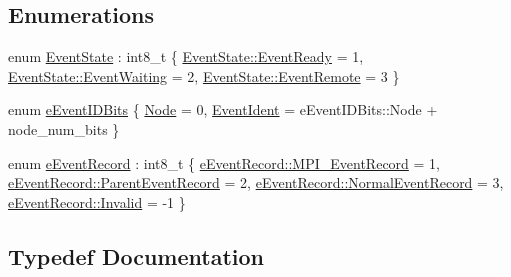 \subsection*{Enumerations}
\begin{DoxyCompactItemize}
\item 
enum \hyperlink{namespacevt_1_1event_a787aca6361696d96d817a639195c429c}{Event\+State} \+: int8\+\_\+t \{ \hyperlink{namespacevt_1_1event_a787aca6361696d96d817a639195c429cac39388d25cc07031a0e9939837999e92}{Event\+State\+::\+Event\+Ready} = 1, 
\hyperlink{namespacevt_1_1event_a787aca6361696d96d817a639195c429ca9fa9370ca123bee33d77fccd7ee8c459}{Event\+State\+::\+Event\+Waiting} = 2, 
\hyperlink{namespacevt_1_1event_a787aca6361696d96d817a639195c429ca6c1cd1c5d55dc05e2b16a4f5f2d2dadd}{Event\+State\+::\+Event\+Remote} = 3
 \}
\item 
enum \hyperlink{namespacevt_1_1event_ad563011dc9e3e01042df27d00092aceb}{e\+Event\+I\+D\+Bits} \{ \hyperlink{namespacevt_1_1event_ad563011dc9e3e01042df27d00092acebadcc2ad1a42eece610bebe64d6c0128d8}{Node} = 0, 
\hyperlink{namespacevt_1_1event_ad563011dc9e3e01042df27d00092aceba2afe9027cb72d9816ad052b1614fbc7f}{Event\+Ident} = e\+Event\+I\+D\+Bits\+:\+:Node + node\+\_\+num\+\_\+bits
 \}
\item 
enum \hyperlink{namespacevt_1_1event_a1ea9fec44d101bf40b8fd786d44ebed9}{e\+Event\+Record} \+: int8\+\_\+t \{ \hyperlink{namespacevt_1_1event_a1ea9fec44d101bf40b8fd786d44ebed9a4d5894349a7d2598349be83e506c5450}{e\+Event\+Record\+::\+M\+P\+I\+\_\+\+Event\+Record} = 1, 
\hyperlink{namespacevt_1_1event_a1ea9fec44d101bf40b8fd786d44ebed9ae0c752eac6805bd001b4aa4912771c14}{e\+Event\+Record\+::\+Parent\+Event\+Record} = 2, 
\hyperlink{namespacevt_1_1event_a1ea9fec44d101bf40b8fd786d44ebed9abd225f70b1ce49f73ff00c2bdf3392a2}{e\+Event\+Record\+::\+Normal\+Event\+Record} = 3, 
\hyperlink{namespacevt_1_1event_a1ea9fec44d101bf40b8fd786d44ebed9a4bbb8f967da6d1a610596d7257179c2b}{e\+Event\+Record\+::\+Invalid} = -\/1
 \}
\end{DoxyCompactItemize}


\subsection{Typedef Documentation}
\mbox{\label{namespacevt_1_1event_a0893245b7a220f3fe6951382e3038afa}} 

